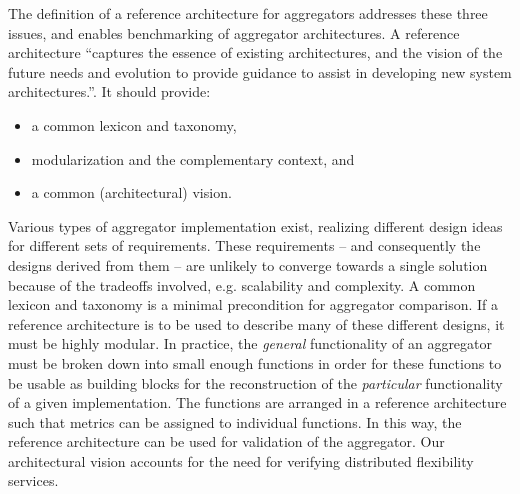 The definition of a reference architecture for aggregators addresses these three issues, and enables benchmarking of aggregator architectures.
A reference architecture ``captures the essence of existing architectures, and the vision of the future needs and evolution to provide guidance to assist in developing new system architectures.''\cite{cloutier2010concept}. It should provide: 
\begin{itemize}
\item a common lexicon and taxonomy,
\item modularization and the complementary context, and
\item a common (architectural) vision.
\end{itemize} 

%
%
Various types of aggregator implementation exist, realizing different design ideas for different sets of requirements. These requirements -- and consequently the designs derived from them -- are unlikely to converge towards a single solution because of the tradeoffs involved, e.g. scalability and complexity. A common lexicon and taxonomy is a minimal precondition for aggregator comparison.
If a reference architecture is to be used to describe many of these different designs, it must be highly modular. In practice, the \emph{general} functionality of an aggregator must be broken down into small enough functions in order for these functions to be usable as building blocks for the reconstruction of the \emph{particular} functionality of a given implementation. 
The functions are arranged in a reference architecture such that metrics can be assigned to individual functions. In this way, the reference architecture can be used for validation of the aggregator. Our architectural vision accounts for the need for verifying distributed flexibility services.

